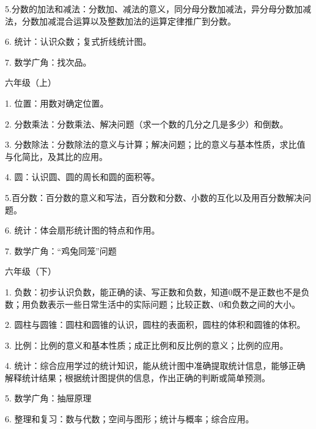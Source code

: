5.分数的加法和减法：分数加、减法的意义，同分母分数加减法，异分母分数加减法，分数加减混合运算以及整数加法的运算定律推广到分数。

6. 统计：认识众数；复式折线统计图。

7. 数学广角：找次品。

六年级（上）

1. 位置：用数对确定位置。

2. 分数乘法：分数乘法、解决问题（求一个数的几分之几是多少）和倒数。

3. 分数除法：分数除法的意义与计算；解决问题；比的意义与基本性质，求比值与化简比，及其比的应用。

4. 圆：认识圆、圆的周长和圆的面积等。

5.百分数：百分数的意义和写法，百分数和分数、小数的互化以及用百分数解决问题。

6. 统计：体会扇形统计图的特点和作用。

7. 数学广角：“鸡兔同笼”问题

六年级（下）

1. 负数：初步认识负数，能正确的读、写正数和负数，知道0既不是正数也不是负数；用负数表示一些日常生活中的实际问题；比较正数、0和负数之间的大小。

2. 圆柱与圆锥：圆柱和圆锥的认识，圆柱的表面积，圆柱的体积和圆锥的体积。

3. 比例：比例的意义和基本性质；成正比例和反比例的意义；比例的应用。

4. 统计：综合应用学过的统计知识，能从统计图中准确提取统计信息，能够正确解释统计结果；根据统计图提供的信息，作出正确的判断或简单预测。

5. 数学广角：抽屉原理

6. 整理和复习：数与代数；空间与图形；统计与概率；综合应用。